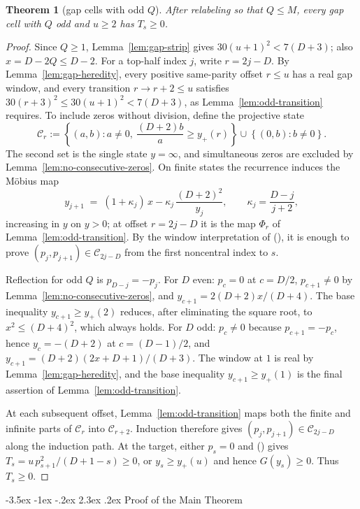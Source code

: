 \documentclass[twoside,10pt]{article}
\makeatletter
\numberwithin{equation}{section}
\theoremstyle{slbody}
\newtheorem{theorem}{Theorem}
\theoremstyle{definition}
\theoremstyle{remark}
\numberwithin{theorem}{section}
\renewcommand{\eqref}[1]{%
  \textup{{\normalfont(\oldstylenums{\ref{#1}}}\normalfont)}}
\renewcommand{\section}{%
  \@startsection{section}{1}{\z@}%
    {-3.5ex \@plus -1ex \@minus -.2ex}%
    {2.3ex \@plus .2ex}%
    {\normalfont\large\bfseries}}
\makeatother
\begin{document}
\begin{theorem}[gap cells with odd $Q$]\label{thm:oddmin}
After relabeling so that $Q\le M$, every gap cell with $Q$ odd and $u\ge2$
has $T_s\ge 0$.
\end{theorem}

\begin{proof}
Since $Q\ge1$, Lemma~\ref{lem:gap-strip} gives $30(u+1)^2<7(D+3)$; also
$x=D-2Q\le D-2$.  For a top-half index $j$, write $r=2j-D$.  By
Lemma~\ref{lem:gap-heredity}, every positive same-parity offset $r\le u$
has a real gap window, and every transition $r\to r+2\le u$ satisfies
$30(r+3)^2\le30(u+1)^2<7(D+3)$, as Lemma~\ref{lem:odd-transition}
requires.  To include zeros without division, define the projective state
\[
 \mathcal C_r:=
 \left\{(a,b):a\ne0,\ \frac{(D+2)b}{a}\ge y_+(r)\right\}
 \cup\left\{(0,b):b\ne0\right\}.
\]
The second set is the single state $y=\infty$, and simultaneous zeros are
excluded by Lemma~\ref{lem:no-consecutive-zeros}.  On finite states the
recurrence induces the M\"obius map
\[
 y_{j+1} \;=\; (1+\kappa_j)\,x - \kappa_j\,\frac{(D+2)^2}{y_j},
 \qquad \kappa_j=\frac{D-j}{j+2},
\]
increasing in $y$ on $y>0$; at offset $r=2j-D$ it is the map $\Phi_r$ of
Lemma~\ref{lem:odd-transition}.  By the window interpretation of
\eqref{eq:window}, it is enough to prove $(p_j,p_{j+1})\in\mathcal C_{2j-D}$
from the first noncentral index to $s$.

Reflection for odd $Q$ is $p_{D-j}=-p_j$.  For $D$ even: $p_c=0$ at
$c=D/2$, $p_{c+1}\ne0$ by Lemma~\ref{lem:no-consecutive-zeros}, and
$y_{c+1}=2(D+2)x/(D+4)$.  The base inequality
$y_{c+1}\ge y_+(2)$ reduces, after eliminating the square root, to
$x^2\le(D+4)^2$, which always holds.  For $D$ odd: $p_c\ne0$ because
$p_{c+1}=-p_c$, hence $y_c=-(D+2)$ at $c=(D-1)/2$, and
$y_{c+1}=(D+2)(2x+D+1)/(D+3)$.  The window at $1$ is real by
Lemma~\ref{lem:gap-heredity}, and the base inequality $y_{c+1}\ge y_+(1)$ is
the final assertion of Lemma~\ref{lem:odd-transition}.

At each subsequent offset, Lemma~\ref{lem:odd-transition} maps both the
finite and infinite parts of $\mathcal C_r$ into $\mathcal C_{r+2}$.
Induction therefore gives $(p_j,p_{j+1})\in\mathcal C_{2j-D}$ along the
induction path.  At the target, either $p_s=0$ and \eqref{eq:qform} gives
$T_s=u\,p_{s+1}^2/(D+1-s)\ge0$, or $y_s\ge y_+(u)$ and hence
$G(y_s)\ge0$.  Thus $T_s\ge0$.
\end{proof}

\section{Proof of the Main Theorem}\label{sec:assembly}
\end{document}
